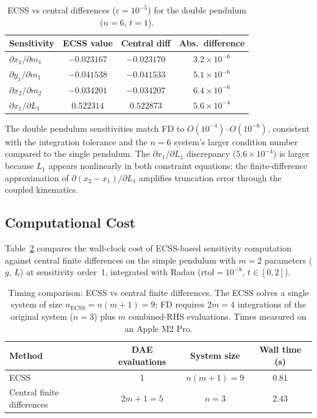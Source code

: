 \documentclass[12pt,a4paper]{article}
\theoremstyle{definition}
\theoremstyle{plain}
\begin{document}
\begin{table}[htbp]
  \centering
  \caption{ECSS vs central differences ($\varepsilon=10^{-5}$) for the double pendulum ($n=6$, $t=1$).}
  \label{tab:double_pendulum}
  \begin{tabular}{lccc}
    \toprule
    Sensitivity & ECSS value & Central diff & Abs.\ difference \\
    \midrule
    $\partial x_1/\partial m_1$ & $-0.023167$ & $-0.023170$ & $3.2\times10^{-6}$ \\
    $\partial y_1/\partial m_1$ & $-0.041538$ & $-0.041533$ & $5.1\times10^{-6}$ \\
    $\partial x_2/\partial m_2$ & $-0.034201$ & $-0.034207$ & $6.4\times10^{-6}$ \\
    $\partial x_1/\partial L_1$ & $0.522314$ & $0.522873$ & $5.6\times10^{-4}$ \\
    \bottomrule
  \end{tabular}
\end{table}

The double pendulum sensitivities match FD to $O(10^{-4})$--$O(10^{-6})$, consistent with the integration tolerance and the $n=6$ system's larger condition number compared to the single pendulum. The $\partial x_1/\partial L_1$ discrepancy ($5.6\times10^{-4}$) is larger because $L_1$ appears nonlinearly in both constraint equations; the finite-difference approximation of $\partial(x_2-x_1)/\partial L_1$ amplifies truncation error through the coupled kinematics.

\subsection{Computational Cost}

Table~\ref{tab:timing} compares the wall-clock cost of ECSS-based sensitivity computation against central finite differences on the simple pendulum with $m=2$ parameters ($g$, $L$) at sensitivity order~1, integrated with Radau ($\text{rtol}=10^{-8}$, $t\in[0,2]$).

\begin{table}[htbp]
  \centering
  \caption{Timing comparison: ECSS vs central finite differences. The ECSS solves a single system of size $n_{\text{ECSS}} = n(m+1) = 9$; FD requires $2m=4$ integrations of the original system ($n=3$) plus $m$ combined-RHS evaluations. Times measured on an Apple M2 Pro.}
  \label{tab:timing}
  \begin{tabular}{lccc}
    \toprule
    Method & DAE evaluations & System size & Wall time (s) \\
    \midrule
    ECSS & 1 & $n(m+1)=9$ & $0.81$ \\
    Central finite differences & $2m+1=5$ & $n=3$ & $2.43$ \\
    \bottomrule
  \end{tabular}
\end{table}
\end{document}
